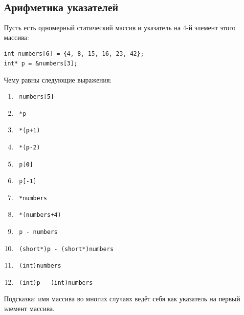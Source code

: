 \documentclass{article}
\begin{document}

\newpage

\subsection*{Арифметика указателей}
Пусть есть одномерный статический массив и указатель на 4-й элемент этого массива:
\begin{verbatim}
int numbers[6] = {4, 8, 15, 16, 23, 42};
int* p = &numbers[3];
\end{verbatim}
Чему равны следующие выражения:
\begin{multicols}{3}
\begin{enumerate}
\item \begin{verbatim} numbers[5] \end{verbatim}
\item \begin{verbatim} *p \end{verbatim}
\item \begin{verbatim} *(p+1) \end{verbatim}
\item \begin{verbatim} *(p-2) \end{verbatim}
\item \begin{verbatim} p[0] \end{verbatim}
\item \begin{verbatim} p[-1] \end{verbatim}
\item \begin{verbatim} *numbers \end{verbatim}
\item \begin{verbatim} *(numbers+4) \end{verbatim}
\item \begin{verbatim} p - numbers \end{verbatim}
\item \begin{verbatim} (short*)p - (short*)numbers \end{verbatim}
\item \begin{verbatim} (int)numbers \end{verbatim}
\item \begin{verbatim} (int)p - (int)numbers \end{verbatim}
\end{enumerate}
\end{multicols}
Подсказка: имя массива во многих случаях ведёт себя как указатель на первый элемент массива.
\end{document}
